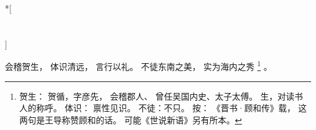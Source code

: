 
\switchcolumn[0]*[\section{}]

会稽贺生，
体识清远，
言行以礼。
不徒东南之美，
实为海内之秀%
\footnote{%
    贺生：
        贺循，字彦先，
        会稽郡人、
        曾任吴国内史、太子太傅。
        生，对读书人的称呼。
    体识：
        禀性见识。
    不徒：不只。
    按：
    《晋书·顾和传》载，
    这两句是王导称赞顾和的话。
    可能《世说新语》另有所本。
}%
。

\switchcolumn


